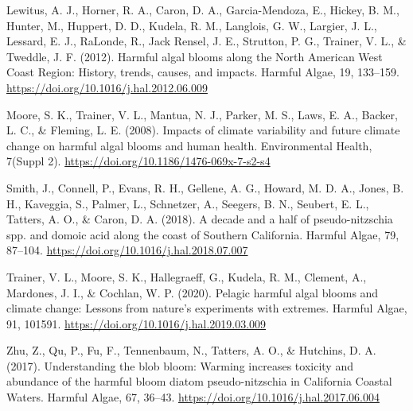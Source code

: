 \documentclass[
  12pt,
]{article}
\begin{document}
Lewitus, A. J., Horner, R. A., Caron, D. A., Garcia-Mendoza, E., Hickey,
B. M., Hunter, M., Huppert, D. D., Kudela, R. M., Langlois, G. W.,
Largier, J. L., Lessard, E. J., RaLonde, R., Jack Rensel, J. E.,
Strutton, P. G., Trainer, V. L., \& Tweddle, J. F. (2012). Harmful algal
blooms along the North American West Coast Region: History, trends,
causes, and impacts. Harmful Algae, 19, 133--159.
\url{https://doi.org/10.1016/j.hal.2012.06.009}

Moore, S. K., Trainer, V. L., Mantua, N. J., Parker, M. S., Laws, E. A.,
Backer, L. C., \& Fleming, L. E. (2008). Impacts of climate variability
and future climate change on harmful algal blooms and human health.
Environmental Health, 7(Suppl 2).
\url{https://doi.org/10.1186/1476-069x-7-s2-s4}

Smith, J., Connell, P., Evans, R. H., Gellene, A. G., Howard, M. D. A.,
Jones, B. H., Kaveggia, S., Palmer, L., Schnetzer, A., Seegers, B. N.,
Seubert, E. L., Tatters, A. O., \& Caron, D. A. (2018). A decade and a
half of pseudo-nitzschia spp. and domoic acid along the coast of
Southern California. Harmful Algae, 79, 87--104.
\url{https://doi.org/10.1016/j.hal.2018.07.007}

Trainer, V. L., Moore, S. K., Hallegraeff, G., Kudela, R. M., Clement,
A., Mardones, J. I., \& Cochlan, W. P. (2020). Pelagic harmful algal
blooms and climate change: Lessons from nature's experiments with
extremes. Harmful Algae, 91, 101591.
\url{https://doi.org/10.1016/j.hal.2019.03.009}

Zhu, Z., Qu, P., Fu, F., Tennenbaum, N., Tatters, A. O., \& Hutchins, D.
A. (2017). Understanding the blob bloom: Warming increases toxicity and
abundance of the harmful bloom diatom pseudo-nitzschia in California
Coastal Waters. Harmful Algae, 67, 36--43.
\url{https://doi.org/10.1016/j.hal.2017.06.004}
\end{document}
